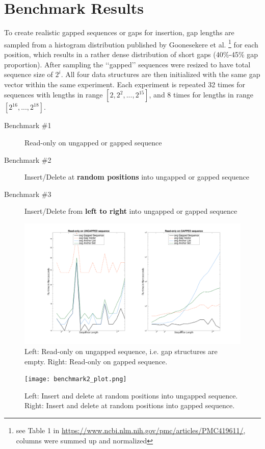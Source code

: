 \documentclass[11pt, letterpaper, twoside]{article}
\begin{document}
\section{Benchmark Results}
To create realistic gapped sequences or gaps for insertion, gap lengths are sampled from a histogram distribution published by Goonesekere et al. \footnote{see Table 1 in \url{https://www.ncbi.nlm.nih.gov/pmc/articles/PMC419611/}, columns were summed up and normalized} for each position, which results in a rather dense distribution of short gaps (40\%-45\% gap proportion). After sampling the \lq\lq gapped\rq\rq{} sequences were resized to have total sequence size of $2^i$. All four data structures are then initialized with the same gap vector within the same experiment. Each experiment is repeated 32 times for sequences with lengths in range $[2, 2^2, ..., 2^{15}]$, and 8 times for lengths in range $[2^{16}, ...,2^{18}]$.
\begin{description}
    \item[Benchmark \#1] Read-only on ungapped or gapped sequence
    \item[Benchmark \#2] Insert/Delete at {\bf random positions} into ungapped or gapped sequence
    \item[Benchmark \#3] Insert/Delete from {\bf left to right} into ungapped or gapped sequence
\end{description}

\begin{figure}\centering
\includegraphics[scale=.4,trim={5cm 2cm 4.5cm 1.5cm},clip]{benchmark1_plot.png}
\caption{Left: Read-only on ungapped sequence, i.e. gap structures are empty. Right: 
Read-only on gapped sequence.}
\end{figure}

\begin{figure}\centering
\texttt{[image: benchmark2\_plot.png]}
\caption{Left: Insert and delete at random positions into ungapped sequence. Right: 
Insert and delete at random positions into gapped sequence.}
\end{figure}
\end{document}
